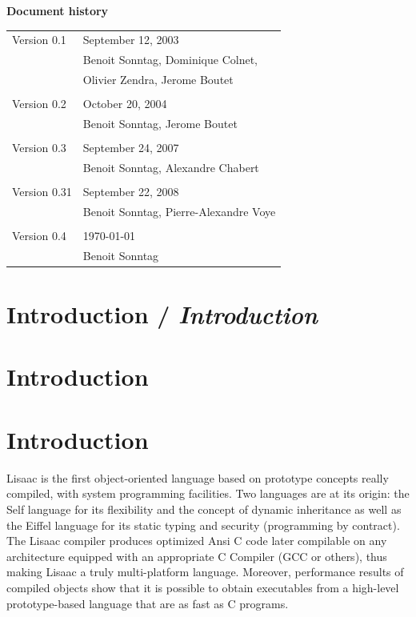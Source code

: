 \documentclass[11pt]{mybook}
\newcommand{\en}[1]
{
  \if \englishversion 1
  #1
  \fi
}
\newcommand{\chapterenfr}[2]
{
  \if \frenchversion 1
    \if \englishversion 1    
     \chapter{#1 / \textit{#2}}
    \else
      \chapter{#2}
    \fi
  \else
    \chapter{#1}
  \fi
}
\begin{document}
\newpage
\thispagestyle{empty}


\begin{center}
\Large{\bf{}Document history}

\vskip 10mm
\begin{tabular}{l l}
{Version 0.1} & {September 12, 2003}\\
{}            & {Benoit Sonntag, Dominique Colnet,} \\
{}            & {Olivier Zendra, Jerome Boutet}\\
{} & {} \\
{Version 0.2} & {October 20, 2004}\\
{}            & {Benoit Sonntag, Jerome Boutet}\\
{} & {} \\
{Version 0.3} & {September 24, 2007} \\
{}            & {Benoit Sonntag, Alexandre Chabert}\\
{} & {} \\
{Version 0.31} & {September 22, 2008} \\
{}            & {Benoit Sonntag, Pierre-Alexandre Voye}\\
{} & {} \\
{Version 0.4} & {\today} \\
{}            & {Benoit Sonntag}\\
\end{tabular}
\end{center}

\newpage
\setcounter{page}{1}
\tableofcontents
\chapterenfr{Introduction}{Introduction}
\label{introduction}
%
\en{
Lisaac is the first object-oriented language based on prototype
concepts really compiled, with system programming facilities.  
Two languages are at its origin:
the Self language \cite{ungar87b} for its flexibility and the concept
of dynamic inheritance as well as the  
Eiffel language \cite{meyer94a} \index{Eiffel} for its static typing
and security (programming by contract). 
The Lisaac compiler produces optimized Ansi C code later compilable on
any architecture equipped with an appropriate C Compiler (GCC or
others), thus making Lisaac a truly multi-platform language. 
Moreover, performance results of compiled objects show that it is possible to
obtain executables from a high-level prototype-based language that are
as fast as C programs.
}
\end{document}
